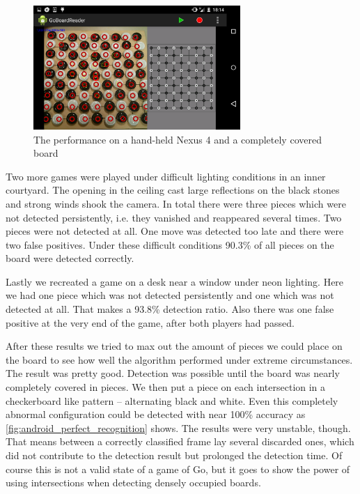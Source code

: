 	\begin{figure}[h!]
		\center
		\includegraphics[width=0.7\textwidth]{images/android_perfect_recognition.png}
		\caption{The performance on a hand-held Nexus 4 and a completely covered board}
		\label{fig:android_perfect_recognition}
	\end{figure}
	Two more games were played under difficult lighting conditions in an inner courtyard. The opening in the ceiling cast large reflections on the black stones and strong winds shook the camera. In total there were three pieces which were not detected persistently, i.e. they vanished and reappeared several times. Two pieces were not detected at all. One move was detected too late and there were two false positives. Under these difficult conditions 90.3\% of all pieces on the board were detected correctly.

	Lastly we recreated a game on a desk near a window under neon lighting. Here we had one piece which was not detected persistently and one which was not detected at all. That makes a 93.8\% detection ratio. Also there was one false positive at the very end of the game, after both players had passed.

	After these results we tried to max out the amount of pieces we could place on the board to see how well the algorithm performed under extreme circumstances. The result was pretty good. Detection was possible until the board was nearly completely covered in pieces. We then put a piece on each intersection in a checkerboard like pattern -- alternating black and white. Even this completely abnormal configuration could be detected with near 100\% accuracy as \autoref{fig:android_perfect_recognition} shows. The results were very unstable, though. That means between a correctly classified frame lay several discarded ones, which did not contribute to the detection result but prolonged the detection time. Of course this is not a valid state of a game of Go, but it goes to show the power of using intersections when detecting densely occupied boards.

